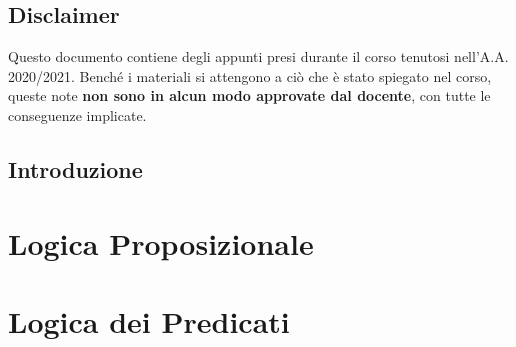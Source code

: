 \documentclass[12pt, a4paper,titlepage]{book}
\begin{document}
\chapter*{Disclaimer}
Questo documento contiene degli appunti presi durante il corso tenutosi 
nell'A.A. 2020/2021. Benché i materiali si attengono a ciò che è stato 
spiegato nel corso, queste note \textbf{non sono in alcun modo approvate 
dal docente}, con tutte le conseguenze implicate.

\chapter{Introduzione}

\cleardoublepage

\part{Logica Proposizionale}




\cleardoublepage

\part{Logica dei Predicati}



\backmatter 
\end{document}
